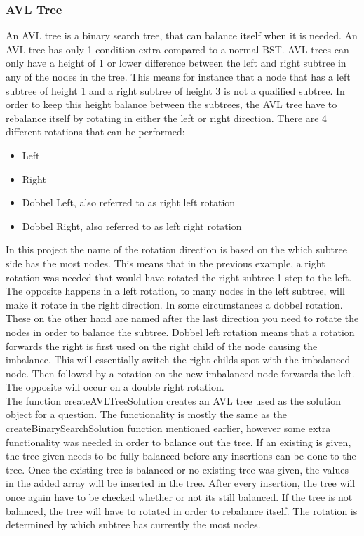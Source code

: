 \subsubsection{AVL Tree}
An AVL tree is a binary search tree, that can balance itself when it is needed. An AVL tree has only 1 condition extra compared to a normal BST. AVL trees can only have a height of 1 or lower difference between the left and right subtree in any of the nodes in the tree. This means for instance that a node that has a left subtree of height 1 and a right subtree of height 3 is not a qualified subtree. In order to keep this height balance between the subtrees, the AVL tree have to rebalance itself by rotating in either the left or right direction. There are 4 different rotations that can be performed:
\begin{itemize}
	\item{Left}
	\item{Right}
	\item{Dobbel Left, also referred to as right left rotation}
	\item{Dobbel Right, also referred to as left right rotation}
\end{itemize}
In this project the name of the rotation direction is based on the which subtree side has the most nodes. This means that in the previous example, a right rotation was needed that would have rotated the right subtree 1 step to the left. The opposite happens in a left rotation, to many nodes in the left subtree, will make it rotate in the right direction. In some circumstances a dobbel rotation. These on the other hand are named after the last direction you need to rotate the nodes in order to balance the subtree. Dobbel left rotation means that a rotation forwards the right is first used on the right child of the node causing the imbalance. This will essentially switch the right childs spot with the imbalanced node. Then followed by a rotation on the new imbalanced node forwards the left. The opposite will occur on a double right rotation.
\\[11pt]
The function createAVLTreeSolution creates an AVL tree used as the solution object for a question. The functionality is mostly the same as the createBinarySearchSolution function mentioned earlier, however some extra functionality was needed in order to balance out the tree. If an existing is given, the tree given needs to be fully balanced before any insertions can be done to the tree. Once the existing tree is balanced or no existing tree was given, the values in the added array will be inserted in the tree. After every insertion, the tree will once again have to be checked whether or not its still balanced. If the tree is not balanced, the tree will have to rotated in order to rebalance itself. The rotation is determined by which subtree has currently the most nodes.
